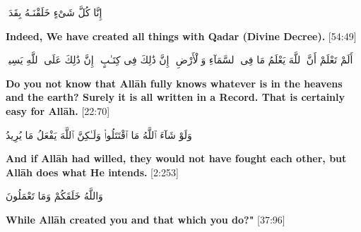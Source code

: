 \begin{center}
    \begin{RLtext}
        إِنَّا كُلَّ شَىْءٍ خَلَقْنَـهُ بِقَدَرٍۢ  
    \end{RLtext}
    \textbf{Indeed, We have created all things with Qadar (Divine Decree).} [54:49]
\end{center}
\begin{center}
    \begin{RLtext}
        أَلَمْ تَعْلَمْ أَنَّ ٱللَّهَ يَعْلَمُ مَا فِى ٱلسَّمَآءِ وَٱلْأَرْضِ ۗ إِنَّ ذَٰلِكَ فِى كِتَـٰبٍ ۚ إِنَّ ذَٰلِكَ عَلَى ٱللَّهِ يَسِيرٌۭ 
    \end{RLtext}
\end{center}
\textbf{Do you not know that All\=ah fully knows whatever is in the heavens and the earth? Surely it is all written in a Record. That is certainly easy for All\=ah.} [22:70]
\begin{center}
    \begin{RLtext}
      وَلَوْ شَآءَ ٱللَّهُ مَا ٱقْتَتَلُوا۟ وَلَـٰكِنَّ ٱللَّهَ يَفْعَلُ مَا يُرِيدُ
    \end{RLtext}
    \textbf{And if Allāh had willed, they would not have fought each other, but Allāh does what He intends.} [2:253]
\end{center}
\begin{center}
    \begin{RLtext}
        وَاللَّهُ خَلَقَكُمْ وَمَا تَعْمَلُونَ
    \end{RLtext}
    \textbf{While Allāh created you and that which you do?"} [37:96]
\end{center}
